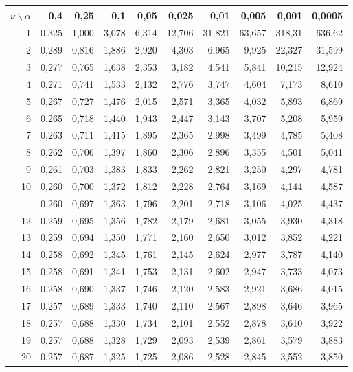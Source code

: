 \documentclass[12pt,a4paper]{article}
\begin{document}
\begin{center}
\small
\begin{tabular*}{\linewidth}{@{\extracolsep{\fill}}rrrrrrrrrr@{}}
\toprule
$\nu \backslash \alpha$ & 0,4 & 0,25 & 0,1 & 0,05 & 0,025 & 0,01 & 0,005 & 0,001 & 0,0005 \\
\midrule
1 & 0,325 & 1,000 & 3,078 & 6,314 & 12,706 & 31,821 & 63,657 & 318,31 & 636,62 \\
2 & 0,289 & 0,816 & 1,886 & 2,920 & 4,303 & 6,965 & 9,925 & 22,327 & 31,599 \\
3 & 0,277 & 0,765 & 1,638 & 2,353 & 3,182 & 4,541 & 5,841 & 10,215 & 12,924 \\
4 & 0,271 & 0,741 & 1,533 & 2,132 & 2,776 & 3,747 & 4,604 & 7,173 & 8,610 \\
5 & 0,267 & 0,727 & 1,476 & 2,015 & 2,571 & 3,365 & 4,032 & 5,893 & 6,869 \\
6 & 0,265 & 0,718 & 1,440 & 1,943 & 2,447 & 3,143 & 3,707 & 5,208 & 5,959 \\
7 & 0,263 & 0,711 & 1,415 & 1,895 & 2,365 & 2,998 & 3,499 & 4,785 & 5,408 \\
8 & 0,262 & 0,706 & 1,397 & 1,860 & 2,306 & 2,896 & 3,355 & 4,501 & 5,041 \\
9 & 0,261 & 0,703 & 1,383 & 1,833 & 2,262 & 2,821 & 3,250 & 4,297 & 4,781 \\
10 & 0,260 & 0,700 & 1,372 & 1,812 & 2,228 & 2,764 & 3,169 & 4,144 & 4,587 \\
\addlinespace[2pt]
11 & 0,260 & 0,697 & 1,363 & 1,796 & 2,201 & 2,718 & 3,106 & 4,025 & 4,437 \\
12 & 0,259 & 0,695 & 1,356 & 1,782 & 2,179 & 2,681 & 3,055 & 3,930 & 4,318 \\
13 & 0,259 & 0,694 & 1,350 & 1,771 & 2,160 & 2,650 & 3,012 & 3,852 & 4,221 \\
14 & 0,258 & 0,692 & 1,345 & 1,761 & 2,145 & 2,624 & 2,977 & 3,787 & 4,140 \\
15 & 0,258 & 0,691 & 1,341 & 1,753 & 2,131 & 2,602 & 2,947 & 3,733 & 4,073 \\
16 & 0,258 & 0,690 & 1,337 & 1,746 & 2,120 & 2,583 & 2,921 & 3,686 & 4,015 \\
17 & 0,257 & 0,689 & 1,333 & 1,740 & 2,110 & 2,567 & 2,898 & 3,646 & 3,965 \\
18 & 0,257 & 0,688 & 1,330 & 1,734 & 2,101 & 2,552 & 2,878 & 3,610 & 3,922 \\
19 & 0,257 & 0,688 & 1,328 & 1,729 & 2,093 & 2,539 & 2,861 & 3,579 & 3,883 \\
20 & 0,257 & 0,687 & 1,325 & 1,725 & 2,086 & 2,528 & 2,845 & 3,552 & 3,850 \\

\end{tabular*}
\end{center}
\end{document}
